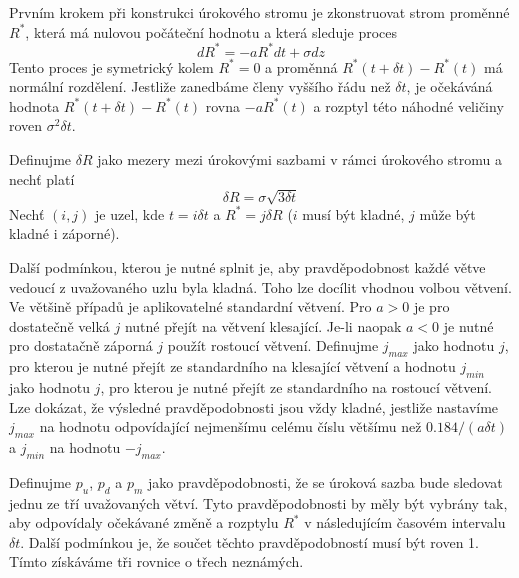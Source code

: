 \documentclass[a4paper]{book}
\begin{document}
Prvním krokem při konstrukci úrokového stromu je zkonstruovat strom proměnné $R^*$, která má nulovou počáteční hodnotu a která sleduje proces
\begin{equation*}
d R^* = -aR^* dt + \sigma dz
\end{equation*}
Tento proces je symetrický kolem $R^* = 0$ a proměnná $R^*(t + \delta t) - R^*(t)$ má normální rozdělení. Jestliže zanedbáme členy vyššího řádu než $\delta t$, je očekáváná hodnota $R^*(t + \delta t) - R^*(t)$ rovna $-aR^*(t)$ a rozptyl této náhodné veličiny roven $\sigma^2 \delta t$.

Definujme $\delta R$ jako mezery mezi úrokovými sazbami v rámci úrokového stromu a nechť platí
\begin{equation*}
\delta R = \sigma \sqrt{3 \delta t}
\end{equation*}
Nechť $(i,j)$ je uzel, kde $t = i \delta t$ a $R^* = j \delta R$ ($i$ musí být kladné, $j$ může být kladné i záporné).

Další podmínkou, kterou je nutné splnit je, aby pravděpodobnost každé větve vedoucí z uvažovaného uzlu byla kladná. Toho lze docílit vhodnou volbou větvení. Ve většině případů je aplikovatelné standardní větvení. Pro $a > 0$ je pro dostatečně velká $j$ nutné přejít na větvení klesající. Je-li naopak $a < 0$ je nutné pro dostatačně záporná $j$ použít rostoucí větvení. Definujme $j_{max}$ jako hodnotu $j$, pro kterou je nutné přejít ze standardního na klesající větvení a hodnotu $j_{min}$ jako hodnotu $j$, pro kterou je nutné přejít ze standardního na rostoucí větvení. Lze dokázat, že výsledné pravděpodobnosti jsou vždy kladné, jestliže nastavíme $j_{max}$ na hodnotu odpovídající nejmenšímu celému číslu většímu než $0.184/(a \delta t)$ a $j_{min}$ na hodnotu $-j_{max}$.

Definujme $p_u$, $p_d$ a $p_m$ jako pravděpodobnosti, že se úroková sazba bude sledovat jednu ze tří uvažovaných větví. Tyto pravděpodobnosti by měly být vybrány tak, aby odpovídaly očekávané změně a rozptylu $R^*$ v následujícím časovém intervalu $\delta t$. Další podmínkou je, že součet těchto pravděpodobností musí být roven 1. Tímto získáváme tři rovnice o třech neznámých.
\end{document}
